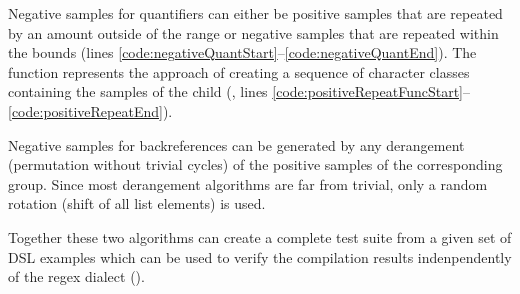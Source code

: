 Negative samples for quantifiers can either be positive samples that are repeated by an amount outside of the range or negative samples that are repeated within the bounds (lines \ref{code:negativeQuantStart}--\ref{code:negativeQuantEnd}). The  function represents the approach of creating a sequence of character classes containing the samples of the child (, lines \ref{code:positiveRepeatFuncStart}--\ref{code:positiveRepeatEnd}).

Negative samples for backreferences can be generated by any derangement (permutation without trivial cycles) of the positive samples of the corresponding group. Since most derangement algorithms are far from trivial, only a random rotation (shift of all list elements) is used.

Together these two algorithms can create a complete test suite from a given set of DSL examples which can be used to verify the compilation results indenpendently of the regex dialect ().

